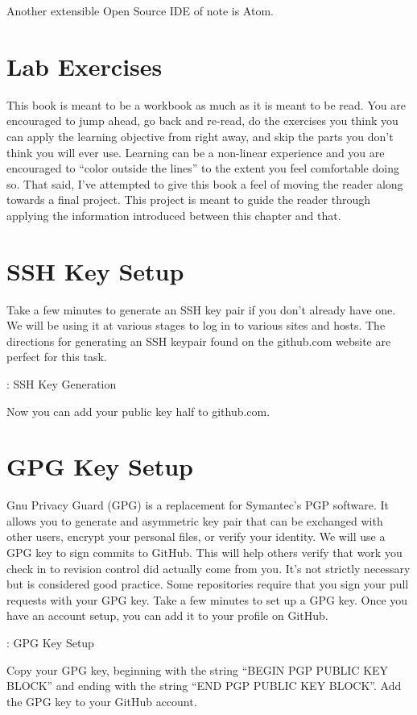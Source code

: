 \justify{}
Another extensible Open Source IDE of note is Atom.

\section{Lab Exercises}
\justify{}
This book is meant to be a workbook as much as it is meant to be read.
You are encouraged to jump ahead, go back and re-read, do the exercises
you think you can apply the learning objective from right away,
and skip the parts you don't think you will ever use. Learning can
be a non-linear experience and you
are encouraged to ``color outside the lines'' to the extent you feel
comfortable doing so.
\justify{}
That said, I've attempted to give this book a feel of moving the reader
along towards a final project.
This project is meant to guide the reader through applying the information
introduced between this chapter and that.
\section{SSH Key Setup}
\justify{}
Take a few minutes to generate an SSH key pair if you don't already have
one. We will be using it at various stages to log in to various sites
and hosts. The directions for generating an SSH keypair found on the
github.com website
are perfect for this task.
\begin{mybox}{\thetcbcounter: SSH Key Generation}

\end{mybox}
\justify{}
Now you can add your public key half to github.com.
\section{GPG Key Setup}
\justify{}
Gnu Privacy Guard (GPG) is a replacement for Symantec's PGP software. It allows you
to generate and asymmetric key pair that can be exchanged with other users, encrypt your
personal files, or verify your identity.
\justify{}
We will use a GPG key to sign commits
to GitHub. This will help others verify that work you check in to revision control did
actually come from you. It's not strictly necessary but is considered good practice.
Some repositories require that you sign your pull requests with your GPG key.
\justify{}
Take a few minutes to set up a GPG key. Once you have an account setup, you can add
it to your profile on GitHub.
\justify{}
\begin{mybox}{\thetcbcounter: GPG Key Setup}

\end{mybox}
\justify{}
Copy your GPG key, beginning with the string ``BEGIN PGP PUBLIC KEY BLOCK'' and ending with the string
``END PGP PUBLIC KEY BLOCK''. Add the GPG key to your GitHub account.
